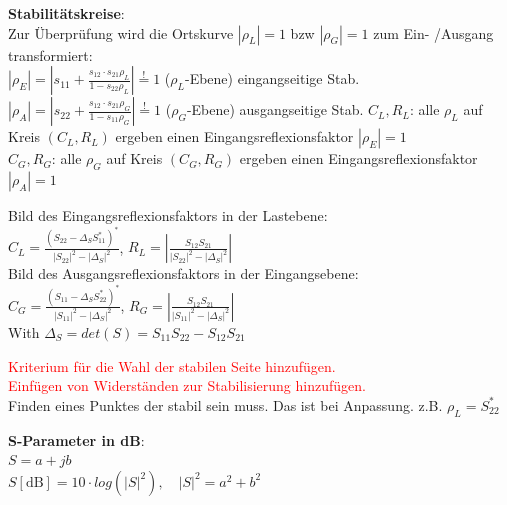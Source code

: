 \documentclass[english]{latex4ei/latex4ei_sheet}
\newcommand{\comment}[1]{\textcolor{red}{#1}}
\begin{document}
\begin{sectionbox}
    \textbf{Stabilitätskreise}:\\
    Zur Überprüfung wird die Ortskurve $\left|\rho_{L}\right|=1$ bzw $\left|\rho_{G}\right|=1$ zum Ein- /Ausgang transformiert:\\
    $\left|\rho_{E}\right|=\left|s_{11}+\frac{s_{12} \cdot s_{21} \rho_{L}}{1-s_{22} \rho_{L}}\right| \stackrel{!}{=} 1$ ($\rho_L$-Ebene) eingangseitige Stab.\\
    $\left|\rho_{A}\right|=\left|s_{22}+\frac{s_{12} \cdot s_{21} \rho_{G}}{1-s_{11} \rho_{G}}\right| \stackrel{!}{=} 1$ ($\rho_G$-Ebene) ausgangseitige Stab.
    $C_L, R_L$: alle $\rho_L$ auf Kreis $(C_L, R_L)$ ergeben einen Eingangsreflexionsfaktor $|\rho_E| = 1$\\
    $C_G, R_G$: alle $\rho_G$ auf Kreis $(C_G, R_G)$ ergeben einen Eingangsreflexionsfaktor $|\rho_A| = 1$
    \begin{emphbox}
        Bild des Eingangsreflexionsfaktors in der Lastebene:\\
        $C_{L}=\frac{\left(S_{22}-\Delta_{S} S_{11}^{*}\right)^{*}}{\left|S_{22}\right|^{2}-\left|\Delta_{S}\right|^{2}}$,
        $R_{L}=\left|\frac{S_{12} S_{21}}{\left|S_{22}\right|^{2}-\left|\Delta_{S}\right|^{2}}\right|$\\
        Bild des Ausgangsreflexionsfaktors in der Eingangsebene:\\
        $C_{G}=\frac{\left(S_{11}-\Delta_{S} S_{22}^{*}\right)^{*}}{\left|S_{11}\right|^{2}-\left|\Delta_{S}\right|^{2}}$, $R_{G}=\left|\frac{S_{12} S_{21}}{\left|S_{11}\right|^{2}-\left|\Delta_{S}\right|^{2}}\right|$\\
        \vspace{1em}
        With $\Delta_{S} = det(S) = S_{11}S_{22}-S_{12}S_{21}$
    \end{emphbox}
    \comment{Kriterium für die Wahl der stabilen Seite hinzufügen.}\\
    \comment{Einfügen von Widerständen zur Stabilisierung hinzufügen.}\\
    Finden eines Punktes der stabil sein muss. Das ist bei Anpassung. z.B. $\rho_L=S^*_{22}$
\end{sectionbox}
\begin{sectionbox}
    \begin{emphbox}
        \begin{flushleft}
            \textbf{S-Parameter in dB}:\\
            $S = a + jb$\\
            $S [\text{dB}] = 10\cdot log(|S|^2), \quad |S|^2 = a^2+b^2$
        \end{flushleft}
    \end{emphbox}
\end{sectionbox}
\end{document}
